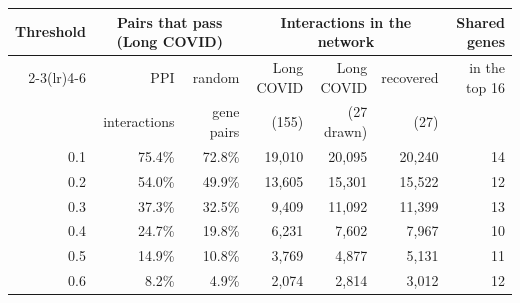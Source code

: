 \begin{tabular}{rrrrrrr}
\toprule
Threshold & \multicolumn{2}{c}{Pairs that pass (Long COVID)} & \multicolumn{3}{c}{Interactions in the network} & Shared genes \\
\cmidrule(lr){2-3}\cmidrule(lr){4-6}
 & PPI & random & Long COVID & Long COVID & recovered & in the top 16 \\
 & interactions & gene pairs & (155) & (27 drawn) & (27) & \\
\midrule
0.1 & 75.4\% & 72.8\% & 19,010 & 20,095 & 20,240 & 14 \\
0.2 & 54.0\% & 49.9\% & 13,605 & 15,301 & 15,522 & 12 \\
0.3 & 37.3\% & 32.5\% & 9,409 & 11,092 & 11,399 & 13 \\
0.4 & 24.7\% & 19.8\% & 6,231 & 7,602 & 7,967 & 10 \\
0.5 & 14.9\% & 10.8\% & 3,769 & 4,877 & 5,131 & 11 \\
0.6 & 8.2\% & 4.9\% & 2,074 & 2,814 & 3,012 & 12 \\
\bottomrule
\end{tabular}
